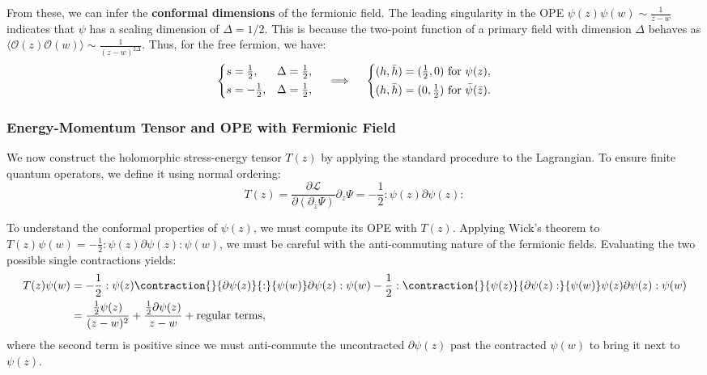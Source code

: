 From these, we can infer the \textbf{conformal dimensions} of the fermionic field. The leading singularity in the OPE \(\psi(z)\psi(w) \sim \frac{1}{z-w}\) indicates that \(\psi\) has a scaling dimension of \(\Delta = 1/2\). This is because the two-point function of a primary field with dimension \(\Delta\) behaves as \(\langle \mathcal{O}(z)\mathcal{O}(w) \rangle \sim \frac{1}{(z-w)^{2\Delta}}\). Thus, for the free fermion, we have:
\[
    \begin{dcases}
        s=\tfrac{1}{2},  & \Delta = \tfrac{1}{2}, \\
        s=-\tfrac{1}{2}, & \Delta = \tfrac{1}{2},
    \end{dcases} \quad \implies \quad \begin{dcases}
        (h, \bar{h}) = (\tfrac{1}{2}, 0) \text{ for } \psi(z), \\
        (h, \bar{h}) = (0, \tfrac{1}{2}) \text{ for } \bar{\psi}(\bar{z}).
    \end{dcases}
\]

\subsubsection{Energy-Momentum Tensor and OPE with Fermionic Field}

We now construct the holomorphic stress-energy tensor \(T(z)\) by applying the standard procedure to the Lagrangian. To ensure finite quantum operators, we define it using normal ordering:
\[
    T(z) = \frac{\partial \mathcal{L}}{\partial (\partial_z \Psi)} \partial_z \Psi = -\frac{1}{2} :\psi(z)\partial\psi(z):
\]

To understand the conformal properties of \(\psi(z)\), we must compute its OPE with \(T(z)\). Applying Wick's theorem to \(T(z)\psi(w) = -\frac{1}{2} :\psi(z)\partial\psi(z): \psi(w)\), we must be careful with the anti-commuting nature of the fermionic fields. Evaluating the two possible single contractions yields:
\[
    \begin{aligned}
        T(z)\psi(w) & = -\frac{1}{2} : \psi(z) \contraction{}{\partial \psi(z)}{:}{\psi(w)} \partial \psi(z) : \psi(w) - \frac{1}{2} :\contraction{}{\psi(z)}{\partial \psi(z):}{\psi(w)} \psi(z) \partial \psi(z): \psi(w) \\
                    & = \frac{\frac{1}{2}\psi(z)}{(z-w)^2} + \frac{\frac{1}{2}\partial\psi(z)}{z-w} + \text{regular terms},
    \end{aligned}
\]
where the second term is positive since we must anti-commute the uncontracted \(\partial \psi(z)\) past the contracted \(\psi(w)\) to bring it next to \(\psi(z)\).


